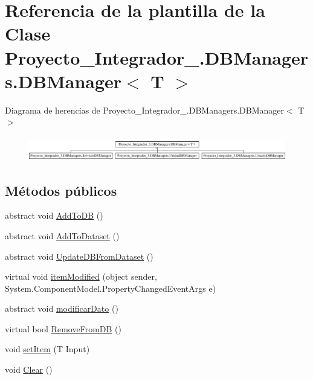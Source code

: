 \hypertarget{class_proyecto___integrador__3_1_1_d_b_managers_1_1_d_b_manager_3_01_t_01_4}{\section{Referencia de la plantilla de la Clase Proyecto\-\_\-\-Integrador\-\_.\-D\-B\-Managers.\-D\-B\-Manager$<$ T $>$}
\label{class_proyecto___integrador__3_1_1_d_b_managers_1_1_d_b_manager_3_01_t_01_4}
}
Diagrama de herencias de Proyecto\-\_\-\-Integrador\-\_.\-D\-B\-Managers.\-D\-B\-Manager$<$ T $>$\begin{figure}[H]
\begin{center}
\leavevmode
\includegraphics[height=1.075889cm]{d7/d0e/class_proyecto___integrador__3_1_1_d_b_managers_1_1_d_b_manager_3_01_t_01_4}
\end{center}
\end{figure}
\subsection*{Métodos públicos}
\begin{DoxyCompactItemize}
\item 
abstract void \hyperlink{class_proyecto___integrador__3_1_1_d_b_managers_1_1_d_b_manager_3_01_t_01_4_a820a55f3ee3c7fde31b121f3f3ea6179}{Add\-To\-D\-B} ()
\item 
abstract void \hyperlink{class_proyecto___integrador__3_1_1_d_b_managers_1_1_d_b_manager_3_01_t_01_4_a7830332e065723c1799d5804fd202dd1}{Add\-To\-Dataset} ()
\item 
abstract void \hyperlink{class_proyecto___integrador__3_1_1_d_b_managers_1_1_d_b_manager_3_01_t_01_4_aecafeb72fd4ce55d76c16c804e38dae8}{Update\-D\-B\-From\-Dataset} ()
\item 
virtual void \hyperlink{class_proyecto___integrador__3_1_1_d_b_managers_1_1_d_b_manager_3_01_t_01_4_a49ea2a7bfa58a2c536fefa4d60d488d2}{item\-Modified} (object sender, System.\-Component\-Model.\-Property\-Changed\-Event\-Args e)
\item 
abstract void \hyperlink{class_proyecto___integrador__3_1_1_d_b_managers_1_1_d_b_manager_3_01_t_01_4_a0cd8914cf3417e3df2f9d580fdb48aca}{modificar\-Dato} ()
\item 
virtual bool \hyperlink{class_proyecto___integrador__3_1_1_d_b_managers_1_1_d_b_manager_3_01_t_01_4_a436cb08914ca84122f9019a59485589a}{Remove\-From\-D\-B} ()
\item 
void \hyperlink{class_proyecto___integrador__3_1_1_d_b_managers_1_1_d_b_manager_3_01_t_01_4_a2d552a5e547efd19924ca4a96f685a56}{set\-Item} (T Input)
\item 
void \hyperlink{class_proyecto___integrador__3_1_1_d_b_managers_1_1_d_b_manager_3_01_t_01_4_ad5d7f99a4a5783514bad64ba8894e1ea}{Clear} ()
\end{DoxyCompactItemize}
